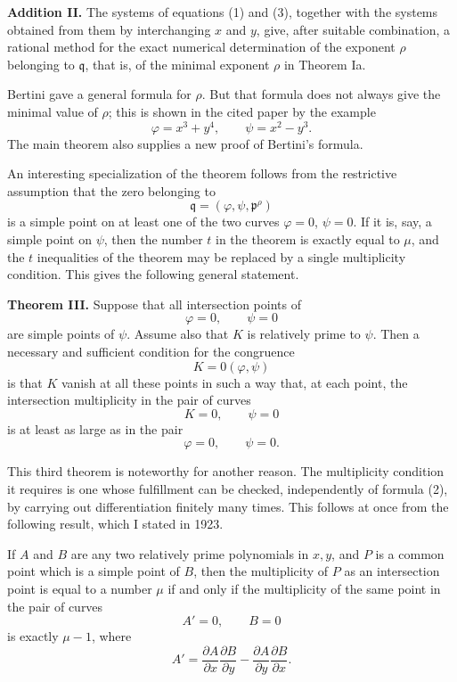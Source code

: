 \documentclass[11pt]{article}
\begin{document}
\textbf{Addition II.} The systems of equations (1) and (3), together with the systems obtained from them by interchanging \(x\) and \(y\), give, after suitable combination, a rational method for the exact numerical determination of the exponent \(\rho\) belonging to \(\mathfrak q\), that is, of the minimal exponent \(\rho\) in Theorem Ia.

Bertini gave a general formula for \(\rho\). But that formula does not always give the minimal value of \(\rho\); this is shown in the cited paper by the example
\[
  \varphi=x^3+y^4,
  \qquad
  \psi=x^2-y^3.
\]
The main theorem also supplies a new proof of Bertini's formula.

An interesting specialization of the theorem follows from the restrictive assumption that the zero belonging to
\[
  \mathfrak q=(\varphi,\psi,\mathfrak p^{\rho})
\]
is a simple point on at least one of the two curves \(\varphi=0\), \(\psi=0\). If it is, say, a simple point on \(\psi\), then the number \(t\) in the theorem is exactly equal to \(\mu\), and the \(t\) inequalities of the theorem may be replaced by a single multiplicity condition. This gives the following general statement.

\textbf{Theorem III.} Suppose that all intersection points of
\[
  \varphi=0,
  \qquad
  \psi=0
\]
are simple points of \(\psi\). Assume also that \(K\) is relatively prime to \(\psi\). Then a necessary and sufficient condition for the congruence
\[
  K=0(\varphi,\psi)
\]
is that \(K\) vanish at all these points in such a way that, at each point, the intersection multiplicity in the pair of curves
\[
  K=0,
  \qquad
  \psi=0
\]
is at least as large as in the pair
\[
  \varphi=0,
  \qquad
  \psi=0.
\]

This third theorem is noteworthy for another reason. The multiplicity condition it requires is one whose fulfillment can be checked, independently of formula (2), by carrying out differentiation finitely many times. This follows at once from the following result, which I stated in 1923.

If \(A\) and \(B\) are any two relatively prime polynomials in \(x,y\), and \(P\) is a common point which is a simple point of \(B\), then the multiplicity of \(P\) as an intersection point is equal to a number \(\mu\) if and only if the multiplicity of the same point in the pair of curves
\[
  A'=0,
  \qquad
  B=0
\]
is exactly \(\mu-1\), where
\[
  A'=\frac{\partial A}{\partial x}\frac{\partial B}{\partial y}
     -
     \frac{\partial A}{\partial y}\frac{\partial B}{\partial x}.
\]
\end{document}

